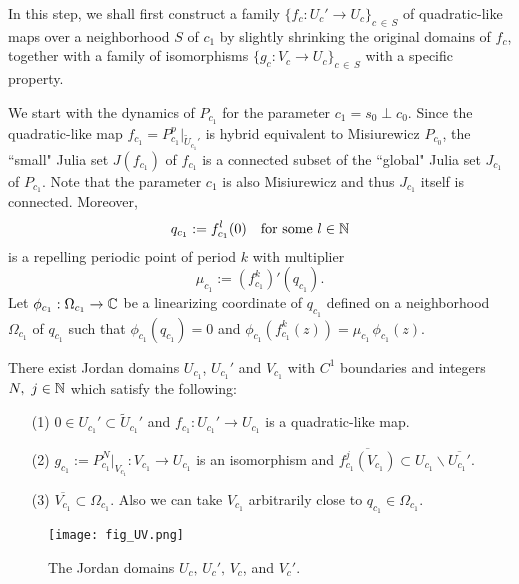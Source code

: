 \indent
In this step, we shall first construct a 
family $\{f_c:U_c' \to U_c\}_{c\, \in \,S}$ 
of quadratic-like maps over a neighborhood $S$ of $c_1$
by slightly shrinking the original domains of $f_c$,
together with a family of isomorphisms 
$\{g_c:V_c \to U_c\}_{c\, \in \,S}$ 
with a specific property.



We start with the dynamics of $P_{c_1}$ for the parameter $c_1=s_0 \perp c_0$.
Since the quadratic-like map $f_{c_1}= P_{c_1}^p|_{\widetilde{U}_{c_1}'}$ is hybrid equivalent to Misiurewicz $P_{c_0}$,
the ``small" Julia set $J(f_{c_1})$ of $f_{c_1}$ 
is a connected subset of the ``global" Julia set $J_{c_1}$ of $P_{c_1}$.
Note that the parameter $c_1$ is also Misiurewicz and thus $J_{c_1}$ itself is connected. 
Moreover,
$$
  q_{c_1} := f_{c_1}^l(0) \quad \text{for some} \ l \in \mathbb N
$$
is a repelling periodic point of period $k$ with 
multiplier 
$$
  \mu_{c_1} := (f_{c_1}^k)'(q_{c_1}).
$$
Let $\phi_{c_1}: \Omega_{c_1} \to \mathbb C$ 
be a linearizing coordinate of $q_{c_1}$
defined on a neighborhood $\Omega_{c_1}$ of $q_{c_1}$
such that $\phi_{c_1}(q_{c_1}) = 0$ and 
$\phi_{c_1}(f_{c_1}^k(z)) = \mu_{c_1} \,\phi_{c_1}(z)$.




\begin{lem}
There exist Jordan domains $U_{c_1}$, $U_{c_1}'$ and $V_{c_1}$ with $C^1$
boundaries and integers $N, \ j \in \mathbb N$ which satisfy 
the following:
\begin{itemize}
\item[\rm (1)]
$0 \in U_{c_1}' \subset \widetilde{U}_{c_1}'$ and 
$f_{c_1}: U_{c_1}' \to U_{c_1}$ is a 
quadratic-like map.

\item[\rm (2)]
$g_{c_1} := P_{c_1}^N|_{V_{c_1}} : V_{c_1} \to U_{c_1}$ is an isomorphism and
$\overline{f_{c_1}^j(V_{c_1})} 
\subset U_{c_1} \smallsetminus \overline{U_{c_1}'}$.

\item[\rm (3)]
$\overline{V_{c_1}} \subset \Omega_{c_1}$. Also we can take $V_{c_1}$ arbitrarily
close to $q_{c_1} \in \Omega_{c_1}$.
\end{itemize}
\label{def of U_{c_1} etc}
\end{lem}





\begin{figure}[htbp]
\begin{center}
\texttt{[image: fig\_UV.png]}
\caption{\small
The Jordan domains $U_c,\,U_c',\, V_c$, and $V_c'$. 
}\label{UV}
\end{center}
\end{figure}


